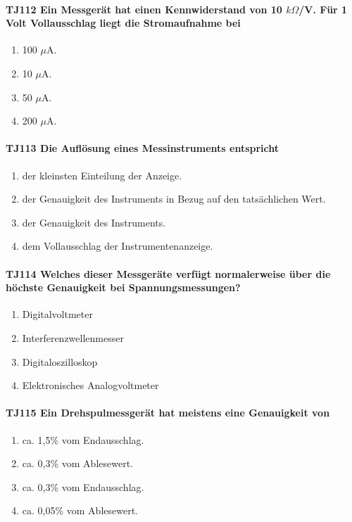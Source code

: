 \documentclass[8pt]{article}
\begin{document}
\paragraph*{TJ112 Ein Messgerät hat einen Kennwiderstand von 10 $k\Omega$/V. Für 1 Volt Vollausschlag liegt die Stromaufnahme bei} 
\begin{enumerate}[nolistsep,label=\Alph*]
\item 100 $\mu$A.
\item 10 $\mu$A.
\item 50 $\mu$A.
\item 200 $\mu$A.
\end{enumerate}

\paragraph*{TJ113 Die Auflösung eines Messinstruments entspricht} 
\begin{enumerate}[nolistsep,label=\Alph*]
\item der kleinsten Einteilung der Anzeige. 
\item der Genauigkeit des Instruments in Bezug auf den tatsächlichen Wert.
\item der Genauigkeit des Instruments.
\item dem Vollausschlag der Instrumentenanzeige.
\end{enumerate}

\paragraph*{TJ114 Welches dieser Messgeräte verfügt normalerweise über die höchste Genauigkeit bei Spannungsmessungen?}
\begin{enumerate}[nolistsep,label=\Alph*]
\item Digitalvoltmeter
\item Interferenzwellenmesser
\item Digitaloszilloskop
\item Elektronisches Analogvoltmeter
\end{enumerate}

\paragraph*{TJ115 Ein Drehspulmessgerät hat meistens eine Genauigkeit von} 
\begin{enumerate}[nolistsep,label=\Alph*]
\item ca. 1,5\% vom Endausschlag.
\item ca. 0,3\% vom Ablesewert.
\item ca. 0,3\% vom Endausschlag.
\item ca. 0,05\% vom Ablesewert.
\end{enumerate}
\end{document}
